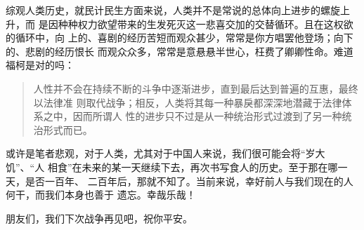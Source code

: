 综观人类历史，就民计民生方面来说，人类并不是常说的总体向上进步的螺旋上升，而
是因种种权力欲望带来的生发死灭这一悲喜交加的交替循环。且在这权欲的循环中，向
上的、喜剧的经历苦短而观众甚少，常常是你方唱罢他登场；向下的、悲剧的经历恨长
而观众众多，常常是意悬悬半世心，枉费了卿卿性命。难道福柯是对的吗：
\begin{quotation}
  人性并不会在持续不断的斗争中逐渐进步，直到最后达到普遍的互惠，最终以法律准
  则取代战争；相反，人类将其每一种暴戾都深深地潜藏于法律体系之中，因而所谓人
  性的进步只不过是从一种统治形式过渡到了另一种统治形式而已。
\end{quotation}


或许是笔者悲观，对于人类，尤其对于中国人来说，我们很可能会将“岁大饥”、“人
相食”在未来的某一天继续下去，再次书写食人的历史。至于那在哪一天，是否一百年、
二百年后，那就不知了。当前来说，幸好前人与我们现在的人何干，而我们本身也善于
遗忘。幸哉乐哉！\bigskip


朋友们，我们下次战争再见吧，祝你平安。

